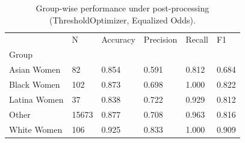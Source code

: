 \begin{table}[htbp]
\centering
\caption{Group-wise performance under post-processing (ThresholdOptimizer, Equalized Odds).}
\label{tab:12-postproc-group-metrics}
\begin{tabular}{llllll}
\toprule
 & N & Accuracy & Precision & Recall & F1 \\
Group &  &  &  &  &  \\
\midrule
Asian Women & 82 & 0.854 & 0.591 & 0.812 & 0.684 \\
Black Women & 102 & 0.873 & 0.698 & 1.000 & 0.822 \\
Latina Women & 37 & 0.838 & 0.722 & 0.929 & 0.812 \\
Other & 15673 & 0.877 & 0.708 & 0.963 & 0.816 \\
White Women & 106 & 0.925 & 0.833 & 1.000 & 0.909 \\
\bottomrule
\end{tabular}

\end{table}